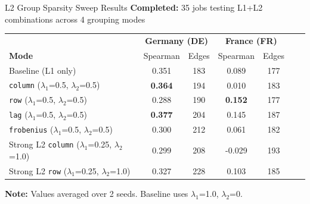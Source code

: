 \documentclass[aspectratio=169]{beamer}
\begin{document}
\begin{frame}{L2 Group Sparsity Sweep Results}
\textbf{Completed:} 35 jobs testing L1+L2 combinations across 4 grouping modes

\vspace{0.2cm}
\begin{table}
\centering
\small
\begin{tabular}{l|cc|cc|cc}
\toprule
& \multicolumn{2}{c|}{\textbf{Germany (DE)}} & \multicolumn{2}{c|}{\textbf{France (FR)}} \\
\textbf{Mode} & Spearman & Edges & Spearman & Edges \\
\midrule
\rowcolor{lightgray} Baseline (L1 only) & 0.351 & 183 & 0.089 & 177 \\
\midrule
\texttt{column} ($\lambda_1$=0.5, $\lambda_2$=0.5) & \textcolor{reprogreen}{\textbf{0.364}} & 194 & 0.010 & 183 \\
\texttt{row} ($\lambda_1$=0.5, $\lambda_2$=0.5) & 0.288 & 190 & \textcolor{reprogreen}{\textbf{0.152}} & 177 \\
\texttt{lag} ($\lambda_1$=0.5, $\lambda_2$=0.5) & \textcolor{reprogreen}{\textbf{0.377}} & 204 & 0.145 & 187 \\
\texttt{frobenius} ($\lambda_1$=0.5, $\lambda_2$=0.5) & 0.300 & 212 & 0.061 & 182 \\
\midrule
Strong L2 \texttt{column} ($\lambda_1$=0.25, $\lambda_2$=1.0) & 0.299 & 208 & -0.029 & 193 \\
Strong L2 \texttt{row} ($\lambda_1$=0.25, $\lambda_2$=1.0) & 0.327 & 228 & 0.103 & 185 \\
\bottomrule
\end{tabular}
\end{table}

\vspace{0.1cm}
\textbf{Note:} Values averaged over 2 seeds. Baseline uses $\lambda_1$=1.0, $\lambda_2$=0.
\end{frame}
\end{document}
